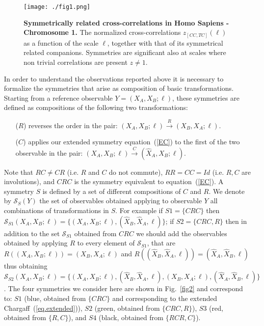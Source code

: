 \documentclass[fleqn,10pt]{wlscirep}
\begin{document}
\begin{figure}[h] 
\centering
\texttt{[image: ./fig1.png]}
\caption{\textbf{Symmetrically related cross-correlations in Homo Sapiens - Chromosome 1.} The normalized cross-correlations $z_{[CC,TC]}(\ell)$ as a function of the scale $\ell$, together with that of  its symmetrical related companions.    Symmetries are significant also at scales where non trivial correlations are present $z\neq1$.}
\label{fig.1}
\end{figure}

In order to understand the observations reported above it is necessary to formalize the symmetries that arise as composition of basic transformations. Starting from a reference observable $Y=(X_A,X_B;\ell)$, these symmetries are defined as compositions of the following two transformations:
  \begin{itemize}
  \item[($R$)] reverses the order in the pair:  $ (X_A, X_B; \ell)  \xrightarrow{R} (X_B,X_A; \ell)$.
  \item[($C$)] applies our extended symmetry equation~(\ref{EC})  to the first of the two observable in the pair: $(X_A,X_B; \ell)  \xrightarrow{C}  (\hat{X}_A,{X}_B; \ell)$.
  \end{itemize}
    Note that $RC \neq CR$ (i.e. $R$ and $C$ do not commute), $RR = CC = Id$ (i.e. $R,C$ are involutions), and $CRC$  is the symmetry equivalent to equation~(\ref{EC}). A symmetry $S$ is defined by a set of different compositions of $C$ and $R$. We denote by $\mathcal{S}_S(Y)$  the set of observables obtained applying to observable $Y$ all combinations of transformations in  $S$. For example if $S1=\{CRC\}$ then $\mathcal{S}_{S1}(X_A, X_B; \ell) =\{ (X_A, X_B; \ell), (\hat{X}_B,\hat{X}_A,\ell)  \}$; if $S2=\{CRC,R\}$ then in addition to the set $\mathcal{S}_{S1}$ obtained from $CRC$ we should add the observables obtained by applying $R$ to every element of $\mathcal{S}_{S1}$, that are $R((X_A, X_B; \ell))=(X_B, X_A; \ell)$ and $R( (\hat{X}_B,\hat{X}_A,\ell))=(\hat{X}_A,\hat{X}_B,\ell) $ thus obtaining $\mathcal{S}_{S2}(X_A, X_B; \ell) =\{ (X_A, X_B; \ell), (\hat{X}_B,\hat{X}_A,\ell), (X_B, X_A; \ell),   (\hat{X}_A,\hat{X}_B,\ell)  \} $.
%
The four symmetries we consider here are shown in Fig.~\ref{fig2}  and correspond to: $S1$ 
(blue, obtained from $\{CRC\}$ and corresponding to the extended Chargaff~(\ref{eq.extended})), $S2$ (green, obtained from $\{CRC,R\}$), $S3$ (red, obtained from $\{R,C\}$),  and $S4$ (black, obtained from $\{RCR,C\}$).
\end{document}
